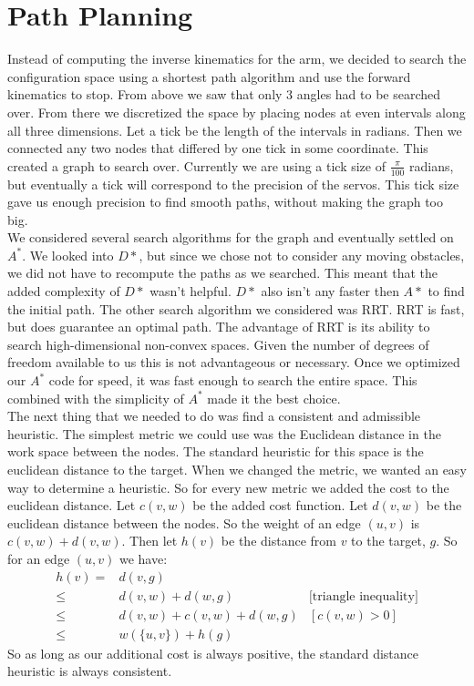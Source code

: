 \documentclass{article}
\begin{document}
\section{Path Planning}
Instead of computing the inverse kinematics for the arm, we decided to search the configuration space using a shortest path algorithm and use the forward kinematics to stop. From above we saw that only 3 angles had to be searched over. From there we discretized the space by placing nodes at even intervals along all three dimensions. Let a tick be the length of the intervals in radians. Then we connected any two nodes that differed by one tick in some coordinate. This created a graph to search over. Currently we are using a tick size of $\frac{\pi}{100}$ radians, but eventually a tick will correspond to the precision of the servos. This tick size gave us enough precision to find smooth paths, without making the graph too big.\\
We considered several search algorithms for the graph and eventually settled on $A^*$. We looked into $D*$, but since we chose not to consider any moving obstacles, we did not have to recompute the paths as we searched. This meant that the added complexity of $D*$ wasn't helpful. $D*$ also isn't any faster then $A*$ to find the initial path. The other search algorithm we considered was RRT. RRT is fast, but does guarantee an optimal path. The advantage of RRT is its ability to search high-dimensional non-convex spaces.  Given the number of degrees of freedom available to us this is not advantageous or necessary. Once we optimized our $A^*$ code for speed, it was fast enough to search the entire space. This combined with the simplicity of $A^*$ made it the best choice.\\
The next thing that we needed to do was find a consistent and admissible heuristic. The simplest metric we could use was the Euclidean distance in the work space between the nodes. The standard heuristic for this space is the euclidean distance to the target. When we changed the metric, we wanted an easy way to determine a heuristic. So for every new metric we added the cost to the euclidean distance. Let $c(v,w)$ be the added cost function. Let $d(v,w)$ be the euclidean distance between the nodes. So the weight of an edge $(u,v)$ is $c(v,w)+d(v,w)$. Then let $h(v)$ be the distance from $v$ to the target, $g$. So for an edge $(u,v)$ we have:
\begin{align*}
h(v) =& d(v,g)\\
\leq& d(v,w) + d(w,g) & \text{[triangle inequality]}\\
\leq& d(v,w) + c(v,w) + d(w,g) & [c(v,w)>0]\\
\leq& w(\{u,v\}) +h(g)
\end{align*}
So as long as our additional cost is always positive, the standard distance heuristic is always consistent. 
\end{document}
